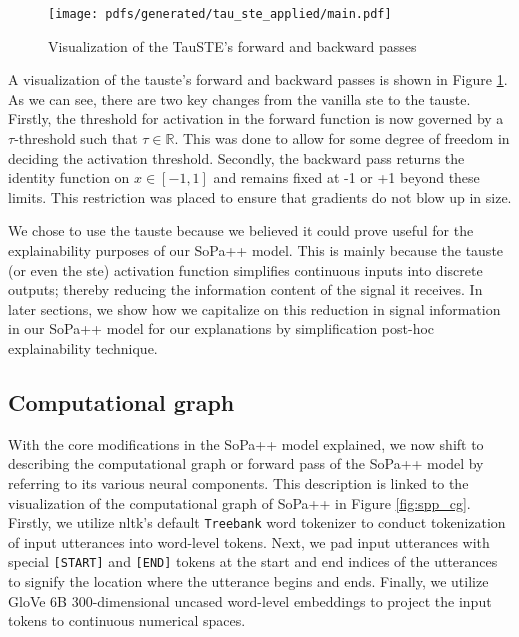 \begin{figure}[t!]
  \centering
  \texttt{[image: pdfs/generated/tau\_ste\_applied/main.pdf]}
  \caption{Visualization of the TauSTE's forward and backward passes}
  \label{fig:tau_ste}
\end{figure}

A visualization of the \ac{tauste}'s forward and backward passes is shown in Figure
\ref{fig:tau_ste}. As we can see, there are two key changes from the vanilla \ac{ste}
to the \ac{tauste}. Firstly, the threshold for activation in the forward function is
now governed by a $\tau$-threshold such that $\tau \in \mathbb{R}$. This was
done to allow for some degree of freedom in deciding the activation threshold.
Secondly, the backward pass returns the identity function on $x \in [-1,1]$ and
remains fixed at -1 or +1 beyond these limits. This restriction was placed to
ensure that gradients do not blow up in size.

We chose to use the \ac{tauste} because we believed it could prove useful for the
explainability purposes of our SoPa++ model. This is mainly because the \ac{tauste}
(or even the \ac{ste}) activation function simplifies continuous inputs into discrete
outputs; thereby reducing the information content of the signal it receives. In
later sections, we show how we capitalize on this reduction in signal
information in our SoPa++ model for our explanations by simplification post-hoc
explainability technique.

\subsection{Computational graph}

With the core modifications in the SoPa++ model explained, we now shift to
describing the computational graph or forward pass of the SoPa++ model by
referring to its various neural components. This description is linked to the
visualization of the computational graph of SoPa++ in Figure \ref{fig:spp_cg}.
Firstly, we utilize \ac{nltk}'s default \texttt{Treebank} word tokenizer
\citep{bird-loper-2004-nltk} to conduct tokenization of input utterances into
word-level tokens. Next, we pad input utterances with special \texttt{[START]}
and \texttt{[END]} tokens at the start and end indices of the utterances to
signify the location where the utterance begins and ends. Finally, we utilize
GloVe 6B 300-dimensional uncased word-level embeddings
\citep{pennington2014glove} to project the input tokens to continuous numerical
spaces. 

